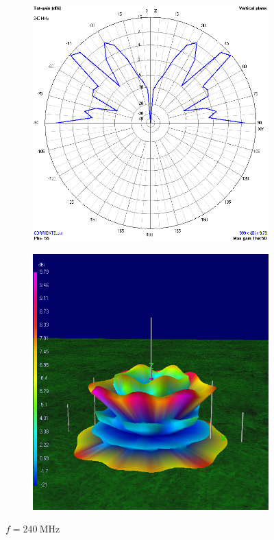 \begin{figure}[H]
	\begin{subfigure}{0.5\textwidth}
		\includegraphics[scale=0.43]{imagenes/2D_240MHz_tierra.png}
	\end{subfigure}	
	\quad
	\begin{subfigure}{0.5\textwidth}
		\includegraphics[scale=0.43]{imagenes/3D_240MHz_tierra.png}
	\end{subfigure}
	\caption{$f=\SI{240}{\mega\hertz}$}
	\label{fig.radiacion_240M_tierra}
\end{figure}

